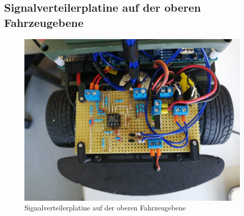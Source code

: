 \subsection{Signalverteilerplatine auf der oberen Fahrzeugebene}\label{Sec8Sub2}


\begin{figure}[H] %
\includegraphics[width=.7\textwidth]{sec8/images/Signalverteilerplatine} 
\centering
\captionsetup{width=.9\textwidth}
\caption[Signalverteilerplatine auf der oberen Fahrzeugebene]{Signalverteilerplatine auf der oberen Fahrzeugebene}
\centering
\label{fig:Signalverteilerplatine}
\end{figure}


\newpage